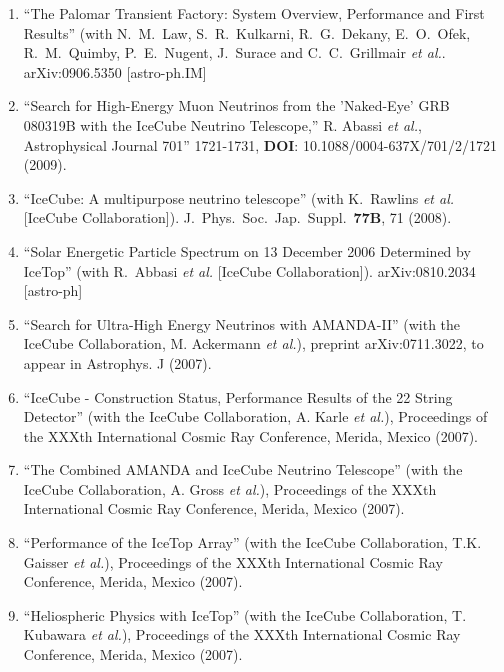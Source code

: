 \begin{enumerate}
\item ``The Palomar Transient Factory: System Overview,
        Performance and   First Results'' (with N.~M.~Law,
        S.~R.~Kulkarni, R.~G.~Dekany,   E.~O.~Ofek,
        R.~M.~Quimby, P.~E.~Nugent, J.~Surace and
        C.~C.~Grillmair {\it et al.}.  \\{}arXiv:0906.5350
        [astro-ph.IM] %

\item ``Search for High-Energy Muon Neutrinos from the
        'Naked-Eye' GRB   080319B with the IceCube Neutrino
        Telescope,” R. Abassi {\it et al.},
        Astrophysical Journal 701'' 1721-1731, {\bf DOI}:
        10.1088/0004-637X/701/2/1721 (2009).

\item ``IceCube: A multipurpose neutrino telescope'' (with
        K.~Rawlins {\it et   al.}  [IceCube Collaboration]).
        J.\ Phys.\ Soc.\ Jap.\ Suppl.\ {\bf 77B}, 71 (2008).

\item ``Solar Energetic Particle Spectrum on 13 December
        2006 Determined by   IceTop'' (with R.~Abbasi {\it
        et al.}  [IceCube Collaboration]). arXiv:0810.2034
        [astro-ph] %

\item ``Search for Ultra-High Energy Neutrinos with
        AMANDA-II'' (with the   IceCube Collaboration, M.
        Ackermann {\it et al.}), preprint   arXiv:0711.3022,
        to appear in Astrophys. J (2007).

\item ``IceCube - Construction Status, Performance Results
        of the 22   String Detector'' (with the IceCube
        Collaboration, A. Karle {\it et al.}),   Proceedings
        of the XXXth International Cosmic Ray Conference,
        Merida, Mexico (2007).

\item ``The Combined AMANDA and IceCube Neutrino Telescope''
        (with the   IceCube Collaboration, A. Gross {\it et
        al.}), Proceedings of the XXXth   International
        Cosmic Ray Conference, Merida, Mexico (2007).

\item ``Performance of the IceTop Array'' (with the IceCube
        Collaboration,   T.K. Gaisser {\it et al.}),
        Proceedings of the XXXth International Cosmic   Ray
        Conference, Merida, Mexico (2007).

\item ``Heliospheric Physics with IceTop'' (with the IceCube
        Collaboration, T. Kubawara {\it et al.}),
        Proceedings of the XXXth   International Cosmic Ray
        Conference, Merida, Mexico (2007).


\end{enumerate}

